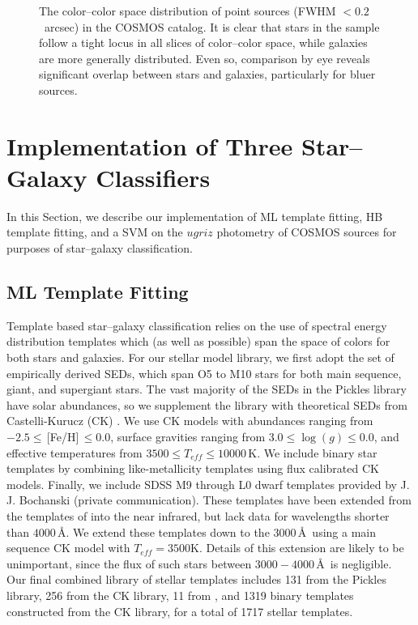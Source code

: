 \documentclass[12pt,preprint]{aastex}
\begin{document}
\begin{figure}
\centering
\caption{The color--color space distribution of point sources (FWHM $<
  0.2$~arcsec) in the COSMOS catalog.  It is clear that stars in the sample
  follow a tight locus in all slices of color--color space, while
  galaxies are more generally distributed.  Even so, comparison by eye
  reveals significant overlap between stars and galaxies, particularly
  for bluer sources.}
\label{fig:color-color-data}
\end{figure}


\section{Implementation of Three Star--Galaxy Classifiers}
\label{sec:specifics}

In this Section, we describe our implementation of ML template
fitting, HB template fitting, and a SVM on the $ugriz$ photometry of
COSMOS sources for purposes of star--galaxy classification.

\subsection{ML Template Fitting}
\label{ssec:MLspecifics}

Template based star--galaxy classification relies on the use of
spectral energy distribution templates which (as well as possible)
span the space of colors for both stars and galaxies.  For our stellar
model library, we first adopt the \citet{pickles98} set of empirically
derived SEDs, which span O5 to M10 stars for both main sequence,
giant, and supergiant stars.  The vast majority of the SEDs in the
Pickles library have solar abundances, so we supplement the library
with theoretical SEDs from Castelli-Kurucz (CK) \citep{castelli04a}.
We use CK models with abundances ranging from $-2.5
\le\,$[Fe/H]$\,\le0.0$, surface gravities ranging from
$3.0\le\log(g)\le0.0$, and effective temperatures from $3500 \le
T_{eff} \le 10000\,$K.  We include binary star templates by combining
like-metallicity templates using flux calibrated CK models.  Finally, we include SDSS
M9 through L0 dwarf templates provided by J. J. Bochanski (private 
communication).  These
templates have been extended from the templates of \citet{bochanski07} into 
the near infrared, but lack data for wavelengths shorter than $4000\,$\AA.  We
extend these templates down to the $3000\,$\AA\, using a main sequence
CK model with $T_{eff}=3500$K.  Details of this extension are likely
to be unimportant, since the flux of such stars between
$3000-4000\,$\AA\, is negligible.  Our final combined library of stellar
templates includes 131 from the Pickles library, 256 from the CK library,
11 from \citet{bochanski07}, and 1319 binary templates constructed from
the CK library, for a total of 1717 stellar templates.
\end{document}

